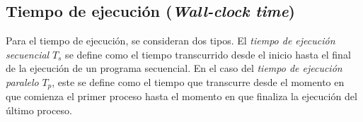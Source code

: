 \subsection{Tiempo de ejecución (\textit{Wall-clock time})}
\label{section:tiemejec}

Para el tiempo de ejecución, se consideran dos tipos. El \emph{tiempo de ejecución secuencial} $T_s$ se define como el tiempo transcurrido desde el inicio hasta el final de la ejecución de un programa secuencial. En el caso del \emph{tiempo de ejecución paralelo} $T_p$, este se define como el tiempo que transcurre desde el momento en que comienza el primer proceso hasta el momento en que finaliza la ejecución del último proceso. \cite{grama2003introduction}